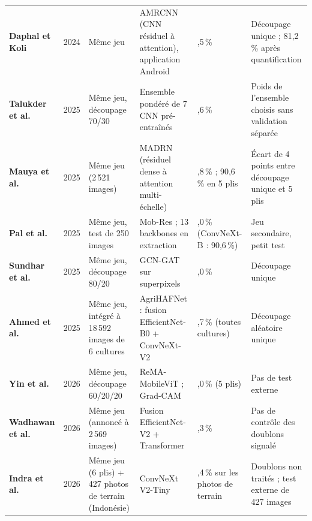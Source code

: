 \begin{table}[p]
\begin{tabularx}{\textwidth}{>{\raggedright\arraybackslash}p{2.1cm} c >{\raggedright\arraybackslash}X >{\raggedright\arraybackslash}X >{\raggedright\arraybackslash}p{1.75cm} >{\raggedright\arraybackslash}X}
\textbf{Daphal et Koli} \cite{daphal2024enhanced} & 2024 & Même jeu & AMRCNN (CNN résiduel à attention), application Android & 86,5\,\% & Découpage unique ; 81,2\,\% après quantification \\
\textbf{Talukder et al.} \cite{talukder2025sugarcanenet} & 2025 & Même jeu, découpage 70/30 & Ensemble pondéré de 7 CNN pré-entraînés & 99,6\,\% & Poids de l'ensemble choisis sans validation séparée \\
\textbf{Mauya et al.} \cite{mauya2025improved} & 2025 & Même jeu (2\,521 images) & MADRN (résiduel dense à attention multi-échelle) & 94,8\,\% ; 90,6\,\% en 5 plis & Écart de 4 points entre découpage unique et 5 plis \\
\textbf{Pal et al.} \cite{pal2025lightweight} & 2025 & Même jeu, test de 250 images & Mob-Res ; 13 backbones en extraction & 88,0\,\% (ConvNeXt-B : 90,6\,\%) & Jeu secondaire, petit test \\
\textbf{Sundhar et al.} \cite{sundhar2025enhancing} & 2025 & Même jeu, découpage 80/20 & GCN-GAT sur superpixels & 91,0\,\% & Découpage unique \\
\textbf{Ahmed et al.} \cite{ahmed2025agrihafnet} & 2025 & Même jeu, intégré à 18\,592 images de 6 cultures & AgriHAFNet : fusion EfficientNet-B0 + ConvNeXt-V2 & 95,7\,\% (toutes cultures) & Découpage aléatoire unique \\
\textbf{Yin et al.} \cite{yin2026rema} & 2026 & Même jeu, découpage 60/20/20 & ReMA-MobileViT ; Grad-CAM & 99,0\,\% (5 plis) & Pas de test externe \\
\textbf{Wadhawan et al.} \cite{wadhawan2026multiscale} & 2026 & Même jeu (annoncé à 2\,569 images) & Fusion EfficientNet-V2 + Transformer & 98,3\,\% & Pas de contrôle des doublons signalé \\
\textbf{Indra et al.} \cite{indra2026sugarcane} & 2026 & Même jeu (6 plis) + 427 photos de terrain (Indonésie) & ConvNeXt V2-Tiny & 98,4\,\% sur les photos de terrain & Doublons non traités ; test externe de 427 images \\
\bottomrule
\end{tabularx}
\end{table}

